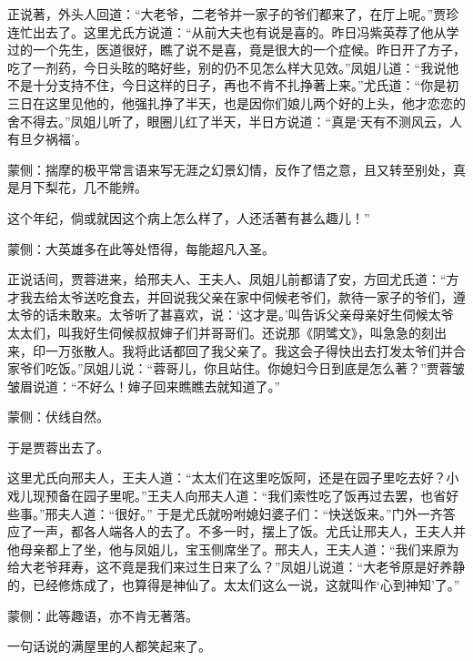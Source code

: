 \begin{parag}
    正说著，外头人回道：“大老爷，二老爷并一家子的爷们都来了，在厅上呢。”贾珍连忙出去了。这里尤氏方说道：“从前大夫也有说是喜的。昨日冯紫英荐了他从学过的一个先生，医道很好，瞧了说不是喜，竟是很大的一个症候。昨日开了方子，吃了一剂药，今日头眩的略好些，别的仍不见怎么样大见效。”凤姐儿道：“我说他不是十分支持不住，今日这样的日子，再也不肯不扎挣著上来。”尤氏道：“你是初三日在这里见他的，他强扎挣了半天，也是因你们娘儿两个好的上头，他才恋恋的舍不得去。”凤姐儿听了，眼圈儿红了半天，半日方说道：“真是‘天有不测风云，人有旦夕祸福’。\begin{note}蒙侧：揣摩的极平常言语来写无涯之幻景幻情，反作了悟之意，且又转至别处，真是月下梨花，几不能辨。\end{note}这个年纪，倘或就因这个病上怎么样了，人还活著有甚么趣儿！”\begin{note}蒙侧：大英雄多在此等处悟得，每能超凡入圣。\end{note}正说话间，贾蓉进来，给邢夫人、王夫人、凤姐儿前都请了安，方回尤氏道：“方才我去给太爷送吃食去，并回说我父亲在家中伺候老爷们，款待一家子的爷们，遵太爷的话未敢来。太爷听了甚喜欢，说：‘这才是。’叫告诉父亲母亲好生伺候太爷太太们，叫我好生伺候叔叔婶子们并哥哥们。还说那《阴骘文》，叫急急的刻出来，印一万张散人。我将此话都回了我父亲了。我这会子得快出去打发太爷们并合家爷们吃饭。”凤姐儿说：“蓉哥儿，你且站住。你媳妇今日到底是怎么著？”贾蓉皱皱眉说道：“不好么！婶子回来瞧瞧去就知道了。”\begin{note}蒙侧：伏线自然。\end{note}于是贾蓉出去了。
\end{parag}


\begin{parag}
    这里尤氏向邢夫人，王夫人道：“太太们在这里吃饭阿，还是在园子里吃去好？小戏儿现预备在园子里呢。”王夫人向邢夫人道：“我们索性吃了饭再过去罢，也省好些事。”邢夫人道：“很好。” 于是尤氏就吩咐媳妇婆子们：“快送饭来。”门外一齐答应了一声，都各人端各人的去了。不多一时，摆上了饭。尤氏让邢夫人，王夫人并他母亲都上了坐，他与凤姐儿，宝玉侧席坐了。邢夫人，王夫人道：“我们来原为给大老爷拜寿，这不竟是我们来过生日来了么？”凤姐儿说道：“大老爷原是好养静的，已经修炼成了，也算得是神仙了。太太们这么一说，这就叫作‘心到神知’了。”\begin{note}蒙侧：此等趣语，亦不肯无著落。\end{note}一句话说的满屋里的人都笑起来了。
\end{parag}


